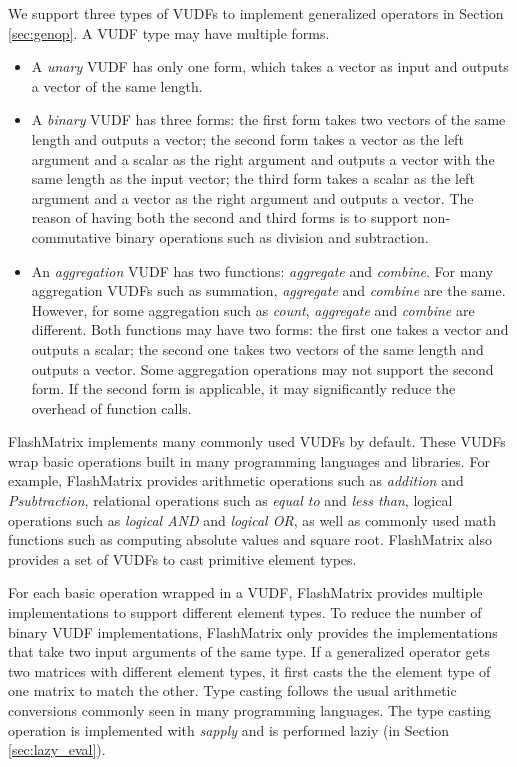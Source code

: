We support three types of VUDFs to implement generalized operators in Section
\ref{sec:genop}. A VUDF type may have multiple forms.
\begin{itemize}
	\item A \textit{unary} VUDF has only one form, which takes a vector as input and
		outputs a vector of the same length.
	\item A \textit{binary} VUDF has three
		forms: the first form takes two vectors of the same length and outputs a vector;
		the second form takes a vector as the left argument and a scalar as the right
		argument and outputs a vector with the same length as the input vector;
		the third form takes a scalar as the left argument and a vector as the right
		argument and outputs a vector. The reason of having both the second and third
		forms is to support non-commutative binary operations such as division and
		subtraction.
	\item An \textit{aggregation} VUDF has two functions: \textit{aggregate}
		and \textit{combine}. For many aggregation VUDFs such as summation,
		\textit{aggregate} and \textit{combine} are the same. However, for
		some aggregation such as \textit{count}, \textit{aggregate} and
		\textit{combine} are different. Both functions may have two forms:
		the first one takes a vector and outputs a scalar;
		the second one takes two vectors of the same length and outputs a vector.
		Some aggregation operations may not support the second form. If the second form
		is applicable, it may significantly reduce the overhead of function calls.
\end{itemize}

FlashMatrix implements many commonly used VUDFs by default. These VUDFs wrap
basic operations built in many programming languages and libraries. For example,
FlashMatrix provides arithmetic operations such as \textit{addition} and
\textit{Psubtraction}, relational operations such as \textit{equal to} and
\textit{less than}, logical operations such as \textit{logical AND} and
\textit{logical OR}, as well as commonly used math functions such as computing
absolute values and square root. FlashMatrix also provides a set of VUDFs to
cast primitive element types.

For each basic operation wrapped in a VUDF, FlashMatrix provides multiple
implementations to
support different element types. To reduce the number of binary VUDF implementations,
FlashMatrix only provides the implementations that take two input arguments of
the same type. If a generalized operator gets two matrices with different
element types, it first casts the the element type of one matrix to match
the other. Type casting follows the usual arithmetic conversions \cite{}
commonly seen in many programming languages. The type casting operation is
implemented with \textit{sapply} and is performed laziy (in Section
\ref{sec:lazy_eval}).

